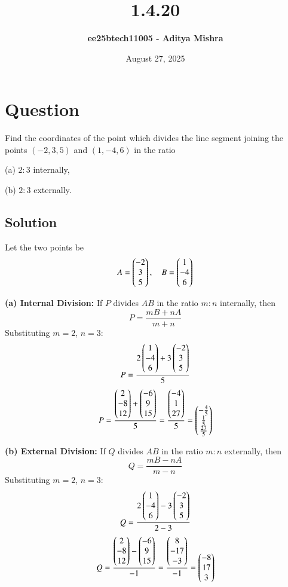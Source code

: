 \documentclass[12pt]{article}
\title{\textbf{1.4.20}}
\author{\textbf{ee25btech11005 - Aditya Mishra}}
\date{August 27, 2025}
\begin{document}
\maketitle

\section*{Question}
Find the coordinates of the point which divides the line segment joining the points $(-2,3,5)$ and $(1,-4,6)$ in the ratio  

(a) $2:3$ internally,  

(b) $2:3$ externally.  

\subsection*{Solution}

Let the two points be  
\[
A = \begin{pmatrix}-2 \\ 3 \\ 5\end{pmatrix}, \quad B = \begin{pmatrix}1 \\ -4 \\ 6\end{pmatrix}
\]  

\textbf{(a) Internal Division:}  
If $P$ divides $AB$ in the ratio $m:n$ internally, then
\[
P = \frac{mB+nA}{m+n}
\]
Substituting $m=2$, $n=3$:
\[
P = \frac{2\begin{pmatrix}1 \\ -4 \\ 6\end{pmatrix} + 3\begin{pmatrix}-2 \\ 3 \\ 5\end{pmatrix}}{5}
\]
\[
P = \frac{\begin{pmatrix}2 \\ -8 \\ 12\end{pmatrix} + \begin{pmatrix}-6 \\ 9 \\ 15\end{pmatrix}}{5}
= \frac{\begin{pmatrix}-4 \\ 1 \\ 27\end{pmatrix}}{5}
= \begin{pmatrix}-\tfrac{4}{5} \\ \tfrac{1}{5} \\ \tfrac{27}{5}\end{pmatrix}
\]

\textbf{(b) External Division:}  
If $Q$ divides $AB$ in the ratio $m:n$ externally, then
\[
Q = \frac{mB-nA}{m-n}
\]
Substituting $m=2$, $n=3$:
\[
Q = \frac{2\begin{pmatrix}1 \\ -4 \\ 6\end{pmatrix} - 3\begin{pmatrix}-2 \\ 3 \\ 5\end{pmatrix}}{2-3}
\]
\[
Q = \frac{\begin{pmatrix}2 \\ -8 \\ 12\end{pmatrix} - \begin{pmatrix}-6 \\ 9 \\ 15\end{pmatrix}}{-1}
= \frac{\begin{pmatrix}8 \\ -17 \\ -3\end{pmatrix}}{-1}
= \begin{pmatrix}-8 \\ 17 \\ 3\end{pmatrix}
\]
\end{document}
